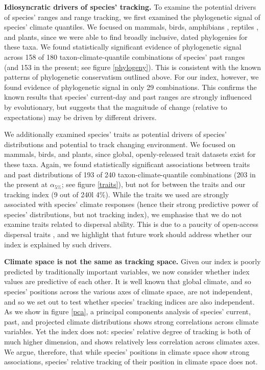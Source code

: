 \documentclass[12pt]{report}
\begin{document}
\textbf{Idiosyncratic drivers of species' tracking.} To examine the
potential drivers of species' ranges and range tracking, we first
examined the phylogenetic signal of species' climate quantiles. We
focused on mammals\supercite{Faurby2015}, birds\supercite{Jetz2012},
amphibians \supercite{Jetz2018}, reptiles \supercite{Zheng2016}, and
plants\supercite{Smith2018}, since we were able to find broadly
inclusive, dated phylogenies for these taxa. We found statistically
significant evidence of phylogenetic signal across 158 of 180
taxon-climate-quantile combinations of species' past ranges (and 153
in the present; see figure \ref{phylogeny}). This is consistent with
the known patterns of phylogenetic conservatism outlined above. For
our index, however, we found evidence of phylogenetic signal in only
29 combinations. This confirms the known results that species'
current-day and past ranges are strongly influenced by evolutionary,
but suggests that the magnitude of change (relative to expectations)
may be driven by different drivers.

We additionally examined species' traits as potential drivers of
species' distributions and potential to track changing environment. We
focused on mammals\supercite{Jones2009a,Wilman2014},
birds\supercite{Wilman2014}, and plants\supercite{Wright2004}, since
global, openly-released trait datasets exist for these taxa. Again, we
found statistically significant associations between traits and past
distributions of 193 of 240 taxon-climate-quantile combinations (203
in the present at $\alpha_{5\%}$; see figure \ref{traits}), but not
for between the traits and our tracking index (9 out of 240l
4\%). While the traits we used are strongly associated with species'
climate responses\supercite{Wright2004} (hence their strong predictive
power of species' distributions, but not tracking index), we emphasise
that we do not examine traits related to dispersal ability. This is
due to a paucity of open-access dispersal traits
\supercite{Gallagher2019}, and we highlight that future work should
address whether our index is explained by such drivers.

\textbf{Climate space is not the same as tracking space.} Given our
index is poorly predicted by traditionally important variables, we now
consider whether index values are predictive of each other. It is well
known that global climate\supercite{xxx}, and so species' positions
across the various axes of climate space\supercite{xxx}, are not
independent, and so we set out to test whether species' tracking
indices are also independent. As we show in figure \ref{pca}, a
principal components analysis of species' current, past, and projected
climate distributions shows strong correlations across climate
variables. Yet the index does not: species' relative degree of
tracking is both of much higher dimension, and shows relatively less
correlation across climates axes. We argue, therefore, that while
species' positions in climate space show strong associations, species'
relative tracking of their position in climate space does not.
\end{document}
